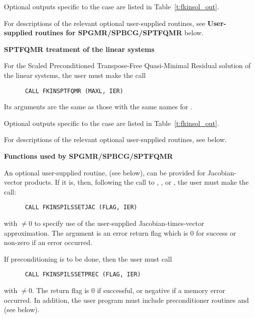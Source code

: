 \begin{Steps}
  Optional outputs specific to the {\spbcg} case are listed in
  Table~\ref{t:fkinsol_out}.

  For descriptions of the relevant optional user-supplied routines, see 
  {\bf User-supplied routines for SPGMR/SPBCG/SPTFQMR} below.
  
  
  {\s}{\p} {\bf SPTFQMR treatment of the linear systems}
  
  For the Scaled Preconditioned Transpose-Free Quasi-Minimal Residual solution 
  of the linear systems, the user must make the call
\begin{verbatim}
      CALL FKINSPTFQMR (MAXL, IER)
\end{verbatim}
  Its arguments are the same as those with the same names for .

  Optional outputs specific to the {\sptfqmr} case are listed in
  Table~\ref{t:fkinsol_out}.

  For descriptions of the relevant optional user-supplied routines, see below.


  {\s}{\p} {\bf Functions used by SPGMR/SPBCG/SPTFQMR}

  An optional user-supplied routine,  (see below), can be provided for
  Jacobian-vector products.  If it is, then, following the call to
  , , or , the user must make the call:
\begin{verbatim}
      CALL FKINSPILSSETJAC (FLAG, IER)
\end{verbatim}
  with  $\neq 0$ to specify use of the user-supplied
  Jacobian-times-vector approximation.
  The argument  is an error return flag which is $0$ 
  for success or non-zero if an error occurred.
  
  If preconditioning is to be done, then the user must call
\begin{verbatim}
      CALL FKINSPILSSETPREC (FLAG, IER)
\end{verbatim}
  with  $\neq 0$.  The return flag  is 0 if
  successful, or negative if a memory error occurred.
  In addition, the user program must include
  preconditioner routines  and  (see below).


\end{Steps}
